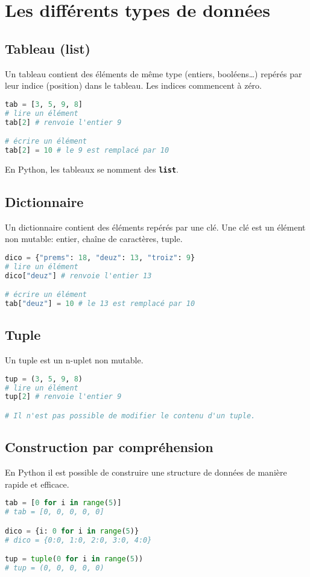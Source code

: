 \documentclass[a4paper,11pt]{article}
\begin{document}
\section{Les différents types de données}
\subsection{Tableau (list)}
Un tableau contient des éléments de même type (entiers, booléens\dots) repérés par leur indice (position) dans le tableau. Les indices commencent à zéro.
\begin{lstlisting}[language=Python  , xleftmargin=2em, xrightmargin=2em]
tab = [3, 5, 9, 8]
# lire un élément
tab[2] # renvoie l'entier 9

# écrire un élément
tab[2] = 10 # le 9 est remplacé par 10
\end{lstlisting}
En Python, les tableaux se nomment des \textbf{\texttt{list}}.
\subsection{Dictionnaire}
Un dictionnaire contient des éléments repérés par une clé. Une clé est un élément non mutable: entier, chaîne de caractères, tuple.
\begin{lstlisting}[language=Python  , xleftmargin=2em, xrightmargin=2em]
dico = {"prems": 18, "deuz": 13, "troiz": 9}
# lire un élément
dico["deuz"] # renvoie l'entier 13

# écrire un élément
tab["deuz"] = 10 # le 13 est remplacé par 10
\end{lstlisting}
\subsection{Tuple}
Un tuple est un n-uplet non mutable.
\begin{lstlisting}[language=Python  , xleftmargin=2em, xrightmargin=2em]
tup = (3, 5, 9, 8)
# lire un élément
tup[2] # renvoie l'entier 9

# Il n'est pas possible de modifier le contenu d'un tuple.
\end{lstlisting}
\subsection{Construction par compréhension}
En Python il est possible de construire une structure de données de manière rapide et efficace.
\begin{center}
    \begin{lstlisting}[language=Python  , xleftmargin=2em, xrightmargin=2em]
tab = [0 for i in range(5)]
# tab = [0, 0, 0, 0, 0]

dico = {i: 0 for i in range(5)}
# dico = {0:0, 1:0, 2:0, 3:0, 4:0}

tup = tuple(0 for i in range(5))
# tup = (0, 0, 0, 0, 0)
\end{lstlisting}
    \label{CODE}
\end{center}
\end{document}
